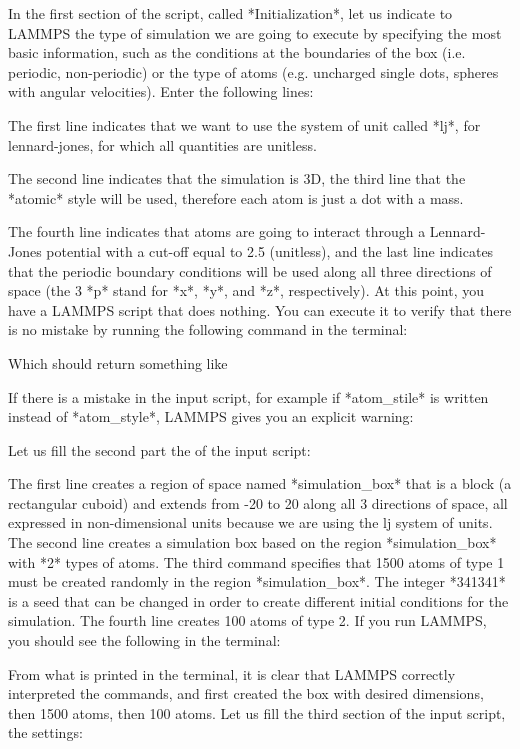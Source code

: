 In the first section of the script, called *Initialization*,
let us indicate to LAMMPS the type of simulation we are
going to execute by specifying the most basic information,
such as the conditions at the boundaries of the box (i.e.
periodic, non-periodic) or the type of atoms (e.g. uncharged
single dots, spheres with angular velocities). Enter the
following lines:

The first line indicates that we want to
use the system of unit called *lj*, for lennard-jones, for which all quantities
are unitless. 

The second line indicates that the simulation
is 3D, the third line that the *atomic* style
will be used, therefore each atom is just a dot with a mass.

The fourth line indicates that atoms are going to interact
through a Lennard-Jones potential with a cut-off equal to
2.5 (unitless), and the last line indicates that the
periodic boundary conditions will be used along all three
directions of space (the 3 *p* stand for *x*, *y*, and *z*,
respectively).
At this point, you have a LAMMPS script that does nothing.
You can execute it to verify that there is no mistake by
running the following command in the terminal:

Which should return something like

If there is a mistake in the input script, for example if
*atom_stile* is written instead of *atom_style*, LAMMPS
gives you an explicit warning:

Let us fill the second part the of the input script:

The first line creates a region of space
named *simulation_box* that is a block (a rectangular cuboid) and
extends from -20 to 20 along all 3 directions of space, all expressed in
non-dimensional units because we are using the lj system
of units. The second line creates a simulation box based on
the region *simulation_box* with *2* types of atoms. The third
command specifies that 1500 atoms of type 1 must be created
randomly in the region *simulation_box*. The integer *341341* is a
seed that can be changed in order to create different
initial conditions for the simulation. The fourth line
creates 100 atoms of type 2.
If you run LAMMPS, you should see the following in the
terminal:

From what is printed in the terminal, it is clear that
LAMMPS correctly interpreted the commands, and first created
the box with desired dimensions, then 1500 atoms, then 100
atoms.
Let us fill the third section of the input script, the settings:

